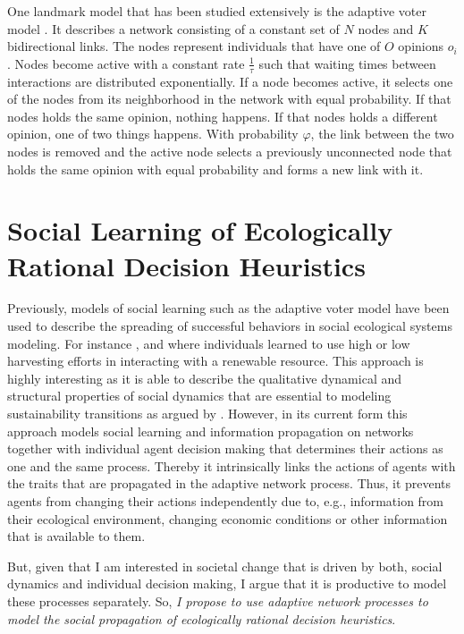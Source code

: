 One landmark model that has been studied extensively is the adaptive voter model \citep{Holme2006a, Bohme2011, Rogers2013, Klamser2016, Min2017}. It describes a network consisting of a constant set of $N$ nodes and $K$ bidirectional links. The nodes represent individuals that have one of $O$ opinions $o_i$. Nodes become active with a constant rate $\frac{1}{\tau}$ such that waiting times between interactions are distributed exponentially. If a node becomes active, it selects one of the nodes from its neighborhood in the network with equal probability. If that nodes holds the same opinion, nothing happens. If that nodes holds a different opinion, one of two things happens. With probability $\varphi$, the link between the two nodes is removed and the active node selects a previously unconnected node that holds the same opinion with equal probability and forms a new link with it.

\section{Social Learning of Ecologically Rational Decision Heuristics}

Previously, models of social learning such as the adaptive voter model have been used to describe the spreading of successful behaviors in social ecological systems modeling. For instance \cite{Wiedermann2015}, \cite{Barfuss2017} and \cite{Geier2019} where individuals learned to use high or low harvesting efforts in interacting with a renewable resource. This approach is highly interesting as it is able to describe the qualitative dynamical and structural properties of social dynamics that are essential to modeling sustainability transitions as argued by \cite{Lade2017}.
However, in its current form this approach models social learning and information propagation on networks together with individual agent decision making that determines their actions as one and the same process. Thereby it intrinsically links the actions of agents with the traits that are propagated in the adaptive network process. Thus, it prevents agents from changing their actions independently due to, e.g., information from their ecological environment, changing economic conditions or other information that is available to them. 

But, given that I am interested in societal change that is driven by both, social dynamics and individual decision making, I argue that it is productive to model these processes separately. So, \emph{I propose to use adaptive network processes to model the social propagation of ecologically rational decision heuristics}.

